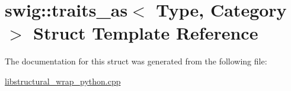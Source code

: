 \hypertarget{structswig_1_1traits__as}{}\section{swig\+:\+:traits\+\_\+as$<$ Type, Category $>$ Struct Template Reference}
\label{structswig_1_1traits__as}


The documentation for this struct was generated from the following file\+:\begin{DoxyCompactItemize}
\item 
\hyperlink{libstructural__wrap__python_8cpp}{libstructural\+\_\+wrap\+\_\+python.\+cpp}\end{DoxyCompactItemize}
